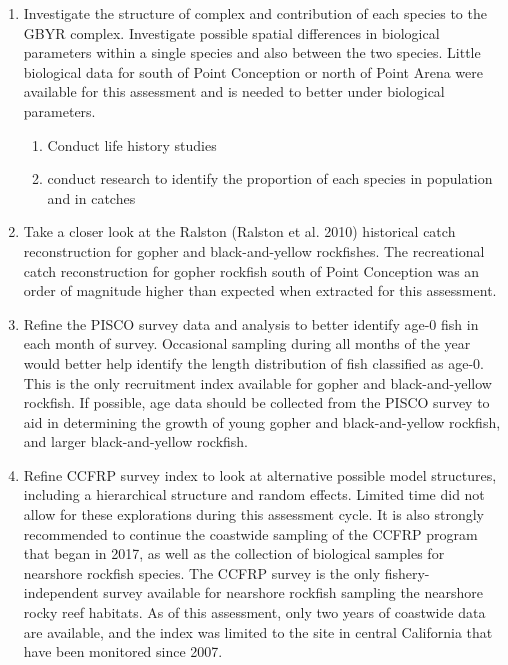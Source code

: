 \documentclass[12pt,]{article}
\begin{document}
\begin{enumerate}

\item Investigate the structure of complex and contribution of each species to the 
GBYR complex. Investigate possible spatial differences in biological parameters within 
a single species and also between the two species.  Little biological data for south of 
Point Conception or north of Point Arena were available for this assessment and is needed 
to better under biological parameters. 
    \begin{enumerate}
     \item Conduct life history studies
     \item conduct research to identify the proportion of each species in population and in catches
    \end{enumerate}

\item Take a closer look at the Ralston (Ralston et al. 2010) historical catch reconstruction 
for gopher and black-and-yellow rockfishes.  The recreational catch reconstruction for 
gopher rockfish south of Point Conception was an order of magnitude higher than expected 
when extracted for this assessment.  

\item Refine the PISCO survey data and analysis to better identify age-0 fish in each 
month of survey.  Occasional sampling during all months of the year would better help 
identify the length distribution of fish classified as age-0. This is the only recruitment 
index available for gopher and black-and-yellow rockfish. If possible, age data should be 
collected from the PISCO survey to aid in determining the growth of young gopher and 
black-and-yellow rockfish, and larger black-and-yellow rockfish.

\item Refine CCFRP survey index to look at alternative possible model structures, including 
a hierarchical structure and random effects.  Limited time did not allow for these 
explorations during this assessment cycle.  It is also strongly recommended to continue 
the coastwide sampling of the CCFRP program that began in 2017, as well as the collection 
of biological samples for nearshore rockfish species.  The CCFRP survey is the only 
fishery-independent survey available for nearshore rockfish sampling the nearshore rocky 
reef habitats. As of this assessment, only two years of coastwide data are available, 
and the index was limited to the site in central California that have been monitored 
since 2007.


\end{enumerate}
\end{document}
